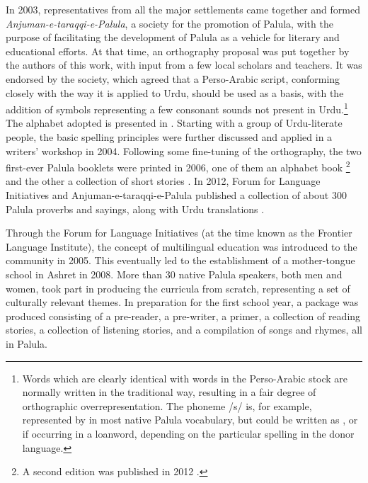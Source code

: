 In 2003, representatives from all the major settlements came together and formed \textit{Anjuman-e-taraqqi-e-Palula}, a society for the promotion of Palula, with the purpose of facilitating the development of Palula as a vehicle for literary and educational efforts. At that time, an orthography proposal was put together by the authors of this work, with input from a few local scholars and teachers. It was endorsed by the society, which agreed that a Perso-Arabic script, conforming closely with the way it is applied to Urdu, should be used as a basis, with the addition of symbols representing a few consonant sounds not present in Urdu.\footnote{Words which are clearly identical with words in the Perso-Arabic stock are normally written in the traditional way, resulting in a fair degree of orthographic overrepresentation. The phoneme /s/ is, for example, represented by {\large{}} in most native Palula vocabulary, but could be written as {\large{}}, {\large{}} or {\large{}} if occurring in a loanword, depending on the particular spelling in the donor language.} The alphabet adopted is presented in . Starting with a group of Urdu-literate people, the basic spelling principles were further discussed and applied in a writers’ workshop in 2004. Following some fine-tuning of the orthography, the two first-ever Palula booklets were printed in 2006, one of them an alphabet book \citep{haider2006a}\footnote{A second edition was published in 2012 \citep{haider2012a}.} and the other a collection of short stories \citep{haider2006b}. In 2012, Forum for Language Initiatives and Anjuman-e-taraqqi-e-Palula published a collection of about 300 Palula proverbs and sayings, along with Urdu translations \citep{haider2012b}.


Through the Forum for Language Initiatives (at the time known as the Frontier Language Institute), the concept of multilingual education was introduced to the community in 2005. This eventually led to the establishment of a mother-tongue school in Ashret in 2008. More than 30 native Palula speakers, both men and women, took part in producing the curricula from scratch, representing a set of culturally relevant themes. In preparation for the first school year, a package was produced consisting of a pre-reader, a pre-writer, a primer, a collection of reading stories, a collection of listening stories, and a compilation of songs and rhymes, all in Palula. 


